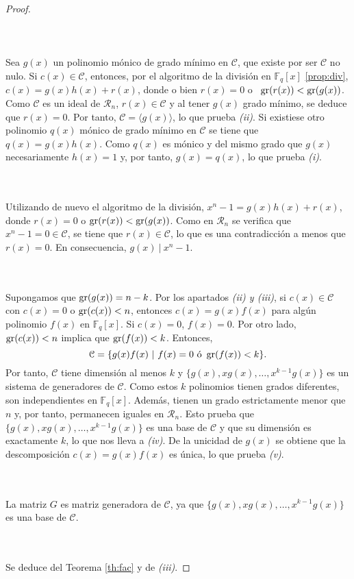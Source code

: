 \begin{proof}
    \phantom{} \\ \\   \\ \\ Sea $g(x)$ un polinomio mónico de grado mínimo en $\mathcal{C}$, que existe por ser $\mathcal{C}$ no nulo. Si $c(x) \in \mathcal{C}$, entonces, por el algoritmo de la división en $\mathbb{F}_q[x]$ \ref{prop:div}, $c(x) = g(x)h(x) + r(x)$, donde o bien $r(x) = 0$ o \ $\operatorname{gr}(r(x)) < \operatorname{gr}(g(x))$. Como $\mathcal{C}$ es un ideal de $\mathcal{R}_n$, $r(x) \in \mathcal{C}$ y al tener $g(x)$ grado mínimo, se deduce que $r(x) = 0$. Por tanto, $\mathcal{C} = \langle g(x) \rangle$, lo que prueba \textit{(ii)}. Si existiese otro polinomio $q(x)$ mónico de grado mínimo en $\mathcal{C}$ se tiene que $q(x) = g(x)h(x)$. Como $q(x)$ es mónico y del mismo grado que $g(x)$ necesariamente $h(x) = 1$ y, por tanto, $g(x) = q(x)$, lo que prueba \textit{(i)}.

     \\ \\ Utilizando de nuevo el algoritmo de la división, $x^n - 1 = g(x)h(x) + r(x)$, donde $r(x) = 0$ o $\operatorname{gr}(r(x)) < \operatorname{gr}(g(x))$. Como en $\mathcal{R}_n$ se verifica que $x^n - 1 = 0 \in \mathcal{C}$, se tiene que $r(x) \in \mathcal{C}$, lo que es una contradicción a menos que $r(x) = 0$. En consecuencia, $ g(x) \ | \ x^n - 1$.

     \\ \\
    Supongamos que $\operatorname{gr}(g(x)) = n-k$. Por los apartados \textit{(ii) y (iii)}, si $c(x) \in \mathcal{C}$ con $c(x) = 0$ o $\operatorname{gr}(c(x)) < n$, entonces $c(x) = g(x)f(x)$ para algún polinomio $f(x)$ en $\mathbb{F}_q[x]$. Si $c(x) = 0$, $f(x) = 0$. Por otro lado, $\operatorname{gr}(c(x)) < n$ implica que $\operatorname{gr}(f(x)) < k$. Entonces,  $$\mathcal{C} = \{g(x)f(x) \ | \ f(x) = 0 \text{ ó } \gr(f(x)) < k\}.$$
    Por tanto, $\mathcal{C}$ tiene dimensión al menos $k$ y $\{g(x),xg(x),\dots,x^{k-1}g(x)\}$ es un sistema de generadores de $\mathcal{C}$. Como estos $k$ polinomios tienen grados diferentes, son independientes en $\mathbb{F}_q[x]$. Además, tienen un grado estrictamente menor que $n$ y, por tanto, permanecen iguales en $\mathcal{R}_n$. Esto prueba que $\{g(x),xg(x),\dots,x^{k-1}g(x)\}$ es una base de $\mathcal{C}$ y que su dimensión es exactamente $k$, lo que nos lleva a \textit{(iv)}. De la unicidad de $g(x)$ se obtiene que la descomposición $c(x) = g(x)f(x)$ es única, lo que prueba \textit{(v)}.

     \\ \\
    La matriz $G$ es matriz generadora de $\mathcal{C}$, ya que $\{g(x),xg(x),\dots,x^{k-1}g(x)\}$ es una base de $\mathcal{C}$.

     \\ \\
    Se deduce del Teorema \ref{th:fac} y de \textit{(iii)}.
\end{proof}

